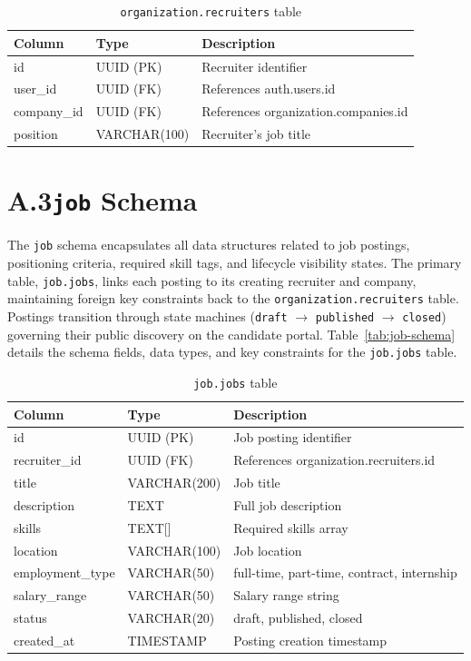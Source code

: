 \begin{table}[htbp]
\centering
\caption{\texttt{organization.recruiters} table}
\small
\begin{tabular}{p{1.5in}p{1.2in}p{2.8in}}
\toprule
\textbf{Column} & \textbf{Type} & \textbf{Description} \\
\midrule
id          & UUID (PK)  & Recruiter identifier \\
user\_id   & UUID (FK)  & References auth.users.id \\
company\_id & UUID (FK) & References organization.companies.id \\
position    & VARCHAR(100) & Recruiter's job title \\
\bottomrule
\end{tabular}
\end{table}

\section*{A.3\quad \texttt{job} Schema}

The \texttt{job} schema encapsulates all data structures related to job postings, positioning criteria, required skill tags, and lifecycle visibility states. The primary table, \texttt{job.jobs}, links each posting to its creating recruiter and company, maintaining foreign key constraints back to the \texttt{organization.recruiters} table. Postings transition through state machines (\texttt{draft} $\rightarrow$ \texttt{published} $\rightarrow$ \texttt{closed}) governing their public discovery on the candidate portal. Table~\ref{tab:job-schema} details the schema fields, data types, and key constraints for the \texttt{job.jobs} table.

\begin{table}[htbp]
\centering
\caption{\texttt{job.jobs} table}
\small
\begin{tabular}{p{1.5in}p{1.2in}p{2.8in}}
\toprule
\textbf{Column} & \textbf{Type} & \textbf{Description} \\
\midrule
id             & UUID (PK)     & Job posting identifier \\
recruiter\_id  & UUID (FK)     & References organization.recruiters.id \\
title          & VARCHAR(200)  & Job title \\
description    & TEXT          & Full job description \\
skills         & TEXT[]        & Required skills array \\
location       & VARCHAR(100)  & Job location \\
employment\_type & VARCHAR(50) & full-time, part-time, contract, internship \\
salary\_range  & VARCHAR(50)   & Salary range string \\
status         & VARCHAR(20)   & draft, published, closed \\
created\_at    & TIMESTAMP     & Posting creation timestamp \\
\bottomrule
\end{tabular}
\end{table}

